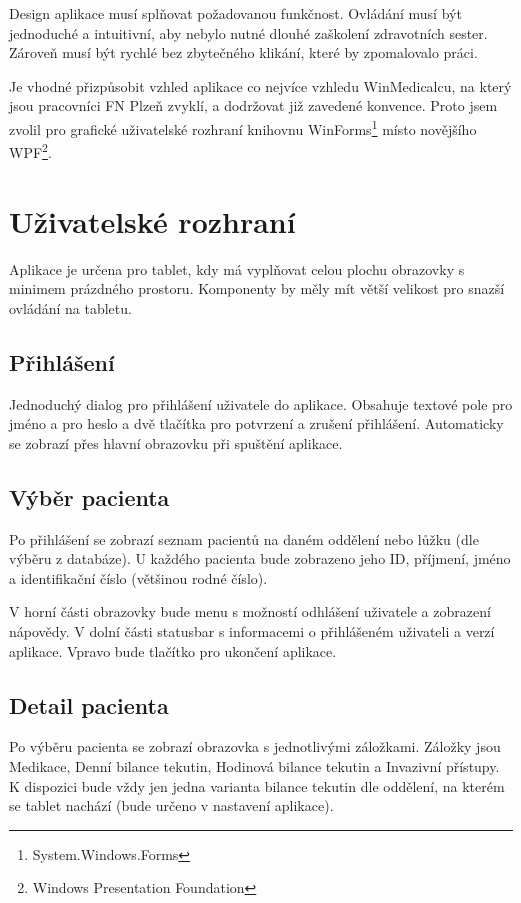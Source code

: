 Design aplikace musí splňovat požadovanou funkčnost. Ovládání musí být jednoduché a intuitivní, aby nebylo nutné dlouhé zaškolení zdravotních sester. Zároveň musí být rychlé bez zbytečného klikání, které by zpomalovalo práci.

Je vhodné přizpůsobit vzhled aplikace co nejvíce vzhledu WinMedicalcu, na který jsou pracovníci FN Plzeň zvyklí, a dodržovat již zavedené konvence. Proto jsem zvolil pro grafické uživatelské rozhraní knihovnu WinForms\footnote{System.Windows.Forms} místo novějšího WPF\footnote{Windows Presentation Foundation}.


\section{Uživatelské rozhraní}

Aplikace je určena pro tablet, kdy má vyplňovat celou plochu obrazovky s minimem prázdného prostoru. Komponenty by měly mít větší velikost pro snazší ovládání na tabletu.

\subsection{Přihlášení}

Jednoduchý dialog pro přihlášení uživatele do aplikace. Obsahuje textové pole pro jméno a pro heslo a dvě tlačítka pro potvrzení a zrušení přihlášení. Automaticky se zobrazí přes hlavní obrazovku při spuštění aplikace.

\subsection{Výběr pacienta}

Po přihlášení se zobrazí seznam pacientů na daném oddělení nebo lůžku (dle výběru z databáze). U každého pacienta bude zobrazeno jeho ID, příjmení, jméno a identifikační číslo (většinou rodné číslo).

V horní části obrazovky bude menu s možností odhlášení uživatele a zobrazení nápovědy. V dolní části statusbar s informacemi o přihlášeném uživateli a verzí aplikace. Vpravo bude tlačítko pro ukončení aplikace.

\subsection{Detail pacienta}

Po výběru pacienta se zobrazí obrazovka s jednotlivými záložkami. Záložky jsou Medikace, Denní bilance tekutin, Hodinová bilance tekutin a Invazivní přístupy. K dispozici bude vždy jen jedna varianta bilance tekutin dle oddělení, na kterém se tablet nachází (bude určeno v nastavení aplikace).

